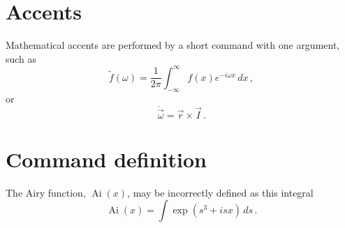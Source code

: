 \documentclass[20pt,a4paper]{extarticle}
\begin{document}
\section{Accents}

Mathematical accents are performed by a short command with one 
argument, such as
\[
\tilde f(\omega)=\frac{1}{2\pi}
\int_{-\infty}^\infty f(x)e^{-i\omega x}\,dx\,,
\]
\newpage
or
\[
\dot{\vec \omega}=\vec r\times\vec I\,.
\]

\section{Command definition}

\newcommand{\Ai}{\operatorname{Ai}} 
The Airy function, $\Ai(x)$, may be incorrectly defined as this 
integral
\[
\Ai(x)=\int\exp(s^3+isx)\,ds\,.
\]
\end{document}

